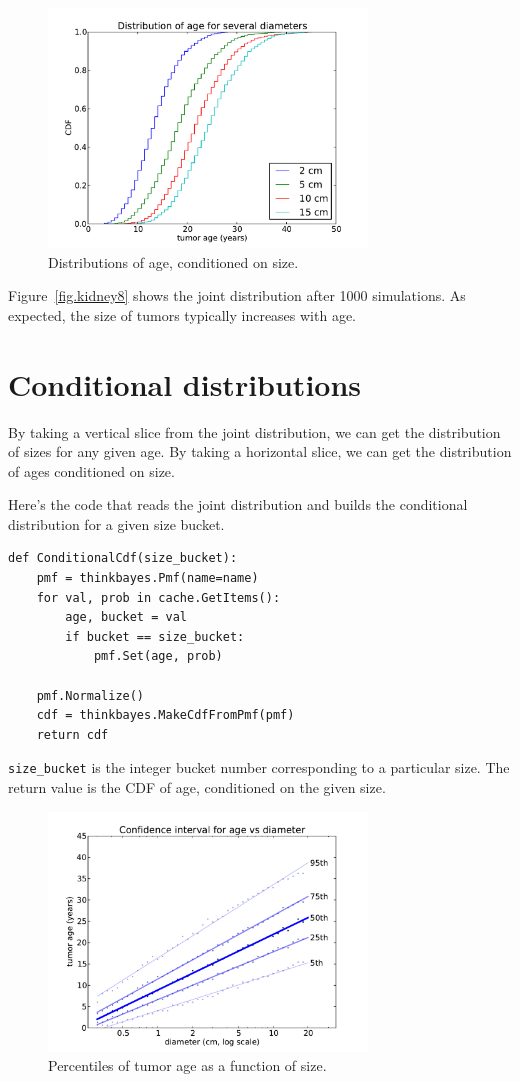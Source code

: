 \documentclass[12pt]{book}
\begin{document}
\begin{figure}
\centerline{\includegraphics[height=2.5in]{figs/kidney6.pdf}}
\caption{Distributions of age, conditioned on size.}
\label{fig.kidney6}
\end{figure}


Figure~\ref{fig.kidney8} shows the joint distribution after 1000
simulations.  As expected, the size of tumors typically increases
with age.

\section{Conditional distributions}

By taking a vertical slice from the joint distribution, we can get the
distribution of sizes for any given age.  By taking a horizontal
slice, we can get the distribution of ages conditioned on size.

Here's the code that reads the joint distribution and builds
the conditional distribution for a given size bucket.

\begin{verbatim}
def ConditionalCdf(size_bucket):
    pmf = thinkbayes.Pmf(name=name)
    for val, prob in cache.GetItems():
        age, bucket = val
        if bucket == size_bucket:
            pmf.Set(age, prob)

    pmf.Normalize()
    cdf = thinkbayes.MakeCdfFromPmf(pmf)
    return cdf
\end{verbatim}

\verb"size_bucket" is the integer bucket number corresponding to a
particular size.  The return value is the CDF of age, conditioned
on the given size.

\begin{figure}
\centerline{\includegraphics[height=2.5in]{figs/kidney7.pdf}}
\caption{Percentiles of tumor age as a function of size.}
\label{fig.kidney7}
\end{figure}
\end{document}
